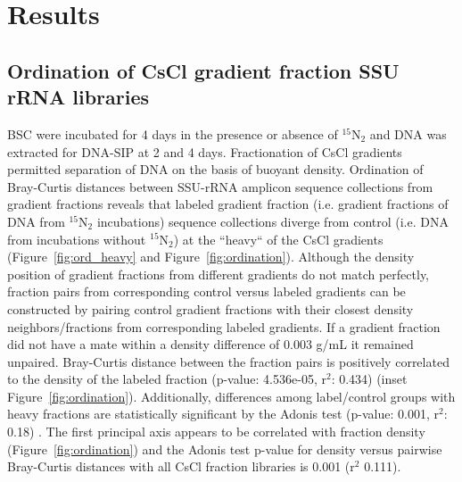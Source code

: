 \section{Results}
\subsection{Ordination of CsCl gradient fraction SSU rRNA libraries} 
BSC were incubated for 4 days in the presence or absence of $^{15}$N$_{2}$ and
DNA was extracted for DNA-SIP at 2 and 4 days. Fractionation of CsCl gradients
permitted separation of DNA on the basis of buoyant density. Ordination of
Bray-Curtis \citep{Bray_1957} distances between SSU-rRNA amplicon sequence
collections from gradient fractions reveals that labeled gradient fraction
(i.e. gradient fractions of DNA from $^{15}$N$_{2}$ incubations) sequence
collections diverge from control (i.e. DNA from incubations without
$^{15}$N$_{2}$) at the ``heavy`` of the CsCl gradients
(Figure~\ref{fig:ord_heavy} and Figure~\ref{fig:ordination}). Although the density position of gradient
fractions from different gradients do not match perfectly, fraction pairs from
corresponding control versus labeled gradients can be constructed by pairing
control gradient fractions with their closest density neighbors/fractions from
corresponding labeled gradients.  If a gradient fraction did not have a mate
within a density difference of 0.003 g/mL it remained unpaired. Bray-Curtis
distance between the fraction pairs is positively correlated to the density of
the labeled fraction (p-value: 4.536e-05, r$^{2}$: 0.434) (inset
Figure~\ref{fig:ordination}). Additionally, differences among label/control groups
with heavy fractions are statistically significant by the Adonis test (p-value:
0.001, r$^{2}$: 0.18) \citep{Anderson_2001}. The first principal axis appears
to be correlated with fraction density (Figure~\ref{fig:ordination}) and the
Adonis test p-value for density versus pairwise Bray-Curtis distances with all
CsCl fraction libraries is 0.001 (r$^{2}$ 0.111).

